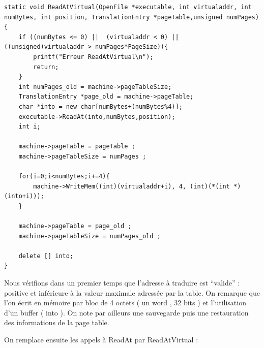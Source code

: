 \documentclass[a4paper,10pt]{article}
\begin{document}
\begin{lstlisting}[frame=single]
 static void ReadAtVirtual(OpenFile *executable, int virtualaddr, int numBytes, int position, TranslationEntry *pageTable,unsigned numPages){
	if ((numBytes <= 0) ||  (virtualaddr < 0) || ((unsigned)virtualaddr > numPages*PageSize)){
		printf("Erreur ReadAtVirtual\n");
		return;
	}
	int numPages_old = machine->pageTableSize;
	TranslationEntry *page_old = machine->pageTable;
	char *into = new char[numBytes+(numBytes%4)];
	executable->ReadAt(into,numBytes,position);
	int i;

	machine->pageTable = pageTable ;
	machine->pageTableSize = numPages ;
	
	for(i=0;i<numBytes;i+=4){
		machine->WriteMem((int)(virtualaddr+i), 4, (int)(*(int *)(into+i)));
	}

	machine->pageTable = page_old ;
	machine->pageTableSize = numPages_old ;

	delete [] into;
}
\end{lstlisting}

Nous vérifions dans un premier temps que l'adresse à traduire est ``valide'' : positive et inférieure à la valeur maximale adressée par la table.
On remarque que l'on écrit en mémoire par bloc de 4 octets ( un word , 32 bits ) et l'utilisation d'un buffer ( into ). On note par ailleurs une sauvegarde puis une restauration
des informations de la page table.

On remplace ensuite les appels à ReadAt par ReadAtVirtual :

\begin{lstlisting}[frame=single]
 
\end{lstlisting}
\end{document}
